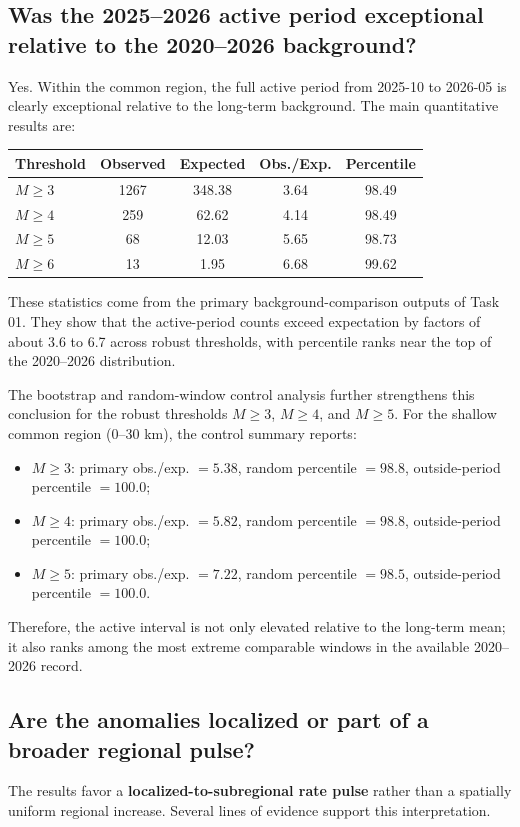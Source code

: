 \documentclass[11pt]{article}
\begin{document}
\subsection{Was the 2025--2026 active period exceptional relative to the 2020--2026 background?}
Yes. Within the common region, the full active period from 2025-10 to 2026-05 is clearly exceptional relative to the long-term background. The main quantitative results are:
\begin{center}
\begin{tabular}{lcccc}
\toprule
Threshold & Observed & Expected & Obs./Exp. & Percentile \\
\midrule
$M\geq 3$ & 1267 & 348.38 & 3.64 & 98.49 \\
$M\geq 4$ & 259 & 62.62 & 4.14 & 98.49 \\
$M\geq 5$ & 68 & 12.03 & 5.65 & 98.73 \\
$M\geq 6$ & 13 & 1.95 & 6.68 & 99.62 \\
\bottomrule
\end{tabular}
\end{center}
These statistics come from the primary background-comparison outputs of Task 01. They show that the active-period counts exceed expectation by factors of about 3.6 to 6.7 across robust thresholds, with percentile ranks near the top of the 2020--2026 distribution.

The bootstrap and random-window control analysis further strengthens this conclusion for the robust thresholds $M\geq 3$, $M\geq 4$, and $M\geq 5$. For the shallow common region (0--30 km), the control summary reports:
\begin{itemize}[leftmargin=1.5em]
    \item $M\geq 3$: primary obs./exp. $= 5.38$, random percentile $= 98.8$, outside-period percentile $= 100.0$;
    \item $M\geq 4$: primary obs./exp. $= 5.82$, random percentile $= 98.8$, outside-period percentile $= 100.0$;
    \item $M\geq 5$: primary obs./exp. $= 7.22$, random percentile $= 98.5$, outside-period percentile $= 100.0$.
\end{itemize}
Therefore, the active interval is not only elevated relative to the long-term mean; it also ranks among the most extreme comparable windows in the available 2020--2026 record.

\subsection{Are the anomalies localized or part of a broader regional pulse?}
The results favor a \textbf{localized-to-subregional rate pulse} rather than a spatially uniform regional increase. Several lines of evidence support this interpretation.
\end{document}
